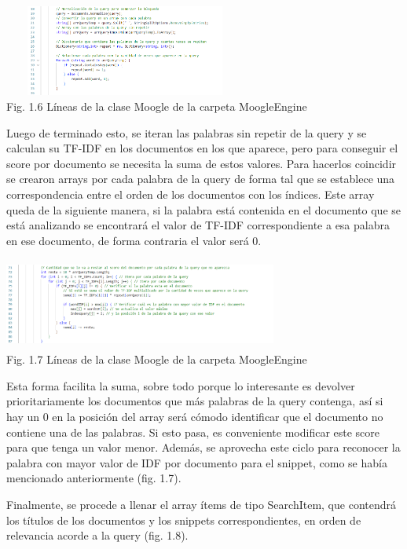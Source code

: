\documentclass[letterpaper]{article}
\begin{document}
{\begin{center}
	\includegraphics[width=8cm, height=3cm]{fig 1.6.png}\\
	{\tiny Fig. 1.6 Líneas de la clase Moogle de la carpeta MoogleEngine}
\end{center}

Luego de terminado esto, se iteran las palabras sin repetir de la query y se calculan su
TF-IDF en los documentos en los que aparece, pero para conseguir el score por documento se
necesita la suma de estos valores. Para hacerlos coincidir se crearon arrays por cada palabra de
la query de forma tal que se establece una correspondencia entre el orden de los documentos
con los índices. Este array queda de la siguiente manera, si la palabra está contenida en el
documento que se está analizando se encontrará el valor de TF-IDF correspondiente a esa
palabra en ese documento, de forma contraria el valor será 0.
\begin{center}
	\includegraphics[width=9cm, height=3cm]{fig 1.7.png}\\
	{\tiny Fig. 1.7 Líneas de la clase Moogle de la carpeta MoogleEngine}
\end{center}

Esta forma facilita la suma, sobre todo porque lo interesante es devolver prioritariamente
los documentos que más palabras de la query contenga, así si hay un 0 en la posición del array
será cómodo identificar que el documento no contiene una de las palabras. Si esto pasa, es
conveniente modificar este score para que tenga un valor menor. Además, se aprovecha este
ciclo para reconocer la palabra con mayor valor de IDF por documento para el snippet, como se
había mencionado anteriormente (fig. 1.7).
\

Finalmente, se procede a llenar el array ítems de tipo SearchItem, que contendrá los títulos
de los documentos y los snippets correspondientes, en orden de relevancia acorde a la query
(fig. 1.8).

}
\end{document}
